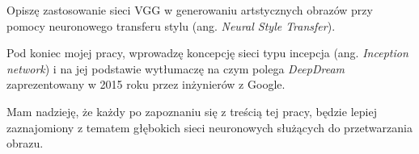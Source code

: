 Opiszę zastosowanie sieci VGG w generowaniu artstycznych obrazów przy pomocy neuronowego transferu stylu (ang. \textit{Neural Style Transfer}). 

Pod koniec mojej pracy, wprowadzę koncepcję sieci typu incepcja (ang. \textit{Inception network}) i na jej
podstawie wytłumaczę na czym polega \textit{DeepDream} zaprezentowany w 2015 roku przez inżynierów z Google.

Mam nadzieję, że każdy po zapoznaniu się z treścią tej pracy, będzie lepiej zaznajomiony z tematem głębokich sieci neuronowych służących do przetwarzania obrazu.
